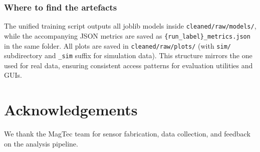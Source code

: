 \documentclass[11pt,a4paper]{article}
\begin{document}
\subsubsection{Where to find the artefacts}
The unified training script outputs all joblib models inside \texttt{cleaned/raw/models/}, while the accompanying JSON metrics are saved as \texttt{\{run\_label\}\_metrics.json} in the same folder. All plots are saved in \texttt{cleaned/raw/plots/} (with \texttt{sim/} subdirectory and \texttt{\_sim} suffix for simulation data). This structure mirrors the one used for real data, ensuring consistent access patterns for evaluation utilities and GUIs.

\section*{Acknowledgements}
We thank the MagTec team for sensor fabrication, data collection, and feedback on the
analysis pipeline.
\end{document}

